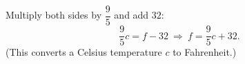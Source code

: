 Multiply both sides by $\dfrac{9}{5}$ and add $32$:
\[
\dfrac{9}{5}c=f-32\ \Rightarrow\ \boxed{f=\dfrac{9}{5}c+32}.
\]
(This converts a Celsius temperature $c$ to Fahrenheit.)
